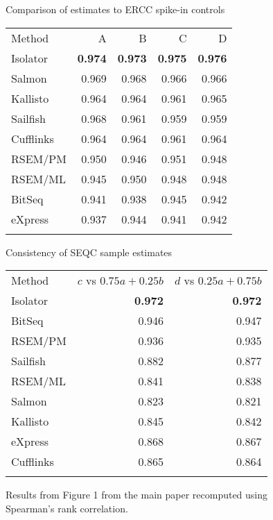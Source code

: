 \documentclass{article}
\begin{document}
\begin{figure*}
\begin{subtable}{0.5\linewidth}
\caption{Comparison of estimates to ERCC spike-in controls}
\begin{tabular}[c]{@{}lrrrr@{}}
\toprule\addlinespace
Method & A & B & C & D
\\\addlinespace
\midrule
Isolator  & \textbf{0.974} & \textbf{0.973} & \textbf{0.975} & \textbf{0.976}
\\\addlinespace
Salmon    & 0.969 & 0.968 & 0.966 & 0.966
\\\addlinespace
Kallisto  & 0.964 & 0.964 & 0.961 & 0.965
\\\addlinespace
Sailfish  & 0.968 & 0.961 & 0.959 & 0.959
\\\addlinespace
Cufflinks & 0.964 & 0.964 & 0.961 & 0.964
\\\addlinespace
RSEM/PM   & 0.950 & 0.946 & 0.951 & 0.948
\\\addlinespace
RSEM/ML   & 0.945 & 0.950 & 0.948 & 0.948
\\\addlinespace
BitSeq    & 0.941 & 0.938 & 0.945 & 0.942
\\\addlinespace
eXpress   & 0.937 & 0.944 & 0.941 & 0.942
\\\addlinespace
\bottomrule
\addlinespace
\end{tabular}
\label{table:ercc:spearman}
\end{subtable}
\begin{subtable}{0.5\linewidth}
\caption{Consistency of SEQC sample estimates}
\begin{tabular}[c]{@{}lrr@{}}
\toprule\addlinespace
Method & $c$ vs $0.75a + 0.25b$ & $d$ vs $0.25a + 0.75b$
\\\addlinespace
\midrule
Isolator  & \textbf{0.972} & \textbf{0.972}
\\\addlinespace
BitSeq    & 0.946 & 0.947
\\\addlinespace
RSEM/PM   & 0.936 & 0.935
\\\addlinespace
Sailfish  & 0.882 & 0.877
\\\addlinespace
RSEM/ML   & 0.841 & 0.838
\\\addlinespace
Salmon    & 0.823 & 0.821
\\\addlinespace
Kallisto  & 0.845 & 0.842
\\\addlinespace
eXpress   & 0.868 & 0.867
\\\addlinespace
Cufflinks & 0.865 & 0.864
\\\addlinespace
\bottomrule
\addlinespace
\end{tabular}
\label{table:seqctranscripts:spearman}
\end{subtable}

\caption{
Results from Figure 1 from the main paper recomputed using Spearman's rank correlation.
}
\end{figure*}
\end{document}
